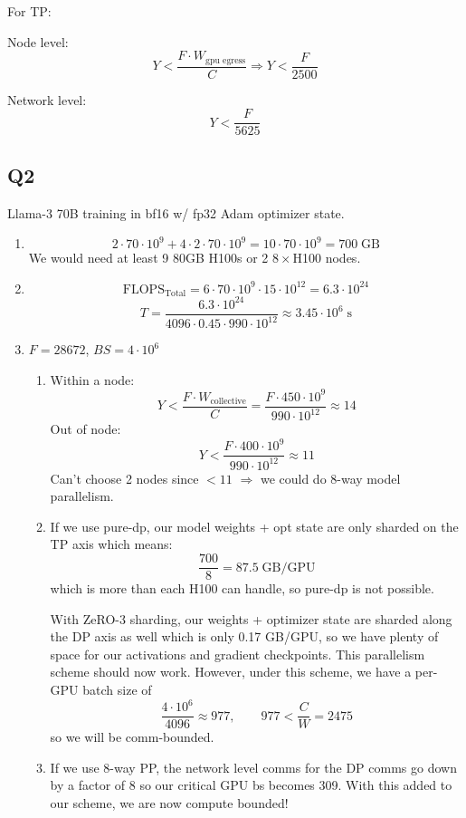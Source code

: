 \documentclass[11pt]{article}
\newcommand{\Wcoll}{W_{\text{collective}}}
\begin{document}
For TP:

Node level:
\[
Y < \frac{F \cdot W_{\text{gpu egress}}}{C} \Rightarrow Y < \frac{F}{2500}
\]

Network level:
\[
Y < \frac{F}{5625}
\]

\subsection*{Q2}

Llama-3 70B training in bf16 w/ fp32 Adam optimizer state.

\begin{enumerate}[label=(\roman*)]
    \item \[
    2 \cdot 70 \cdot 10^9 + 4 \cdot 2 \cdot 70 \cdot 10^9 = 10 \cdot 70 \cdot 10^9 = 700 \;\text{GB}
    \]
    We would need at least 9 80GB H100s or 2 $8 \times$H100 nodes.

    \item \[
    \text{FLOPS}_{\text{Total}} = 6 \cdot 70 \cdot 10^9 \cdot 15 \cdot 10^{12} = 6.3 \cdot 10^{24}
    \]
    \[
    T = \frac{6.3 \cdot 10^{24}}{4096 \cdot 0.45 \cdot 990 \cdot 10^{12}} \approx 3.45 \cdot 10^6 \;\text{s}
    \]

    \item $F = 28672$, $BS = 4 \cdot 10^6$

    \begin{enumerate}[label=(\arabic*)]
        \item Within a node:
        \[
        Y < \frac{F \cdot \Wcoll}{C} = \frac{F \cdot 450 \cdot 10^9}{990 \cdot 10^{12}} \approx 14
        \]
        Out of node:
        \[
        Y < \frac{F \cdot 400 \cdot 10^9}{990 \cdot 10^{12}} \approx 11
        \]
        Can't choose 2 nodes since $< 11$
        $\Rightarrow$ we could do 8-way model parallelism.

        \item If we use pure-dp, our model weights + opt state are only sharded on the TP axis which means:
        \[
        \frac{700}{8} = 87.5 \;\text{GB/GPU}
        \]
        which is more than each H100 can handle, so pure-dp is not possible.

        With ZeRO-3 sharding, our weights + optimizer state are sharded along the DP axis as well which is only 0.17 GB/GPU, so we have plenty of space for our activations and gradient checkpoints. This parallelism scheme should now work. However, under this scheme, we have a per-GPU batch size of
        \[
        \frac{4 \cdot 10^6}{4096} \approx 977, \qquad 977 < \frac{C}{W} = 2475
        \]
        so we will be comm-bounded.

        \item If we use 8-way PP, the network level comms for the DP comms go down by a factor of 8 so our critical GPU bs becomes 309. With this added to our scheme, we are now compute bounded!
    \end{enumerate}
\end{enumerate}
\end{document}
